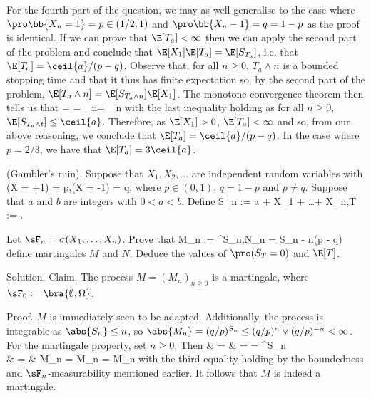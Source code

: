 For the fourth part of the question, we may as well generalise to the case where $\pro\bb{X_n =1} = p \in (1/2,1)$ and $\pro\bb{X_n-1} = q = 1- p$ as the proof is identical. If we can prove that $\E[T_a] < \infty$ then we can apply the second part of the problem and conclude that $\E[X_1]\E[T_a] = \E[S_{T_a}]$, i.e. that $\E[T_a] = \ceil{a}/(p-q)$. Observe that, for all $n \geq 0$, $T_a \land n$ is a bounded stopping time and that it thus has finite expectation so, by the second part of the problem, $\E[T_a\land n] = \E[S_{T_a\land n}] \E[X_1]$. The monotone convergence theorem then tells us that
 \leq \E[T_a]\E[X_1] = \E{} \E[X_1] = \lim_{n\to \infty}\E[T_a \land n]\E[X_1] = \lim_{n\to \infty}\E[S_{T_a\land n}] \leq {}
\ee
with the last inequality holding as for all $n\geq 0$, $\E[S_{T_a\land t}]\leq \ceil{a}$. Therefore, as $\E[X_1]>0$, $\E[T_a]< \infty$ and so, from our above reasoning, we conclude that $\E[T_a] = \ceil{a} /(p-q)$. In the case where $p = 2/3$, we have that $\E[T_a] = 3\ceil{a}$.

\vspace{2mm}

\qcutline


\item (Gambler's ruin). Suppose that $X_1,X_2, \dots$ are independent random variables with
\be
\pro(X = +1) = p,\quad \pro(X = -1) = q,
\ee
where $p \in (0, 1)$, $q = 1 - p$ and $p \neq q$. Suppose that $a$ and $b$ are integers with $ 0 < a < b$. Define
\be
S_n := a + X_1 + \dots + X_n,\quad T := \inf{}.
\ee

Let $\sF_n = \sigma(X_1, \dots ,X_n)$. Prove that
\be
M_n := ^{S_n},\quad N_n = S_n - n(p - q)
\ee
define martingales $M$ and $N$. Deduce the values of $\pro(S_T = 0)$ and $\E[T]$.

\scutline

Solution. Claim. The process $M = (M_n)_{n\geq 0}$ is a martingale, where $\sF_0 := \bra{\emptyset,\Omega}$.

Proof. $M$ is immediately seen to be adapted. Additionally, the process is integrable as $\abs{S_n} \leq n$, so $\abs{M_n} = (q/p)^{S_n} \leq  (q/p)^n \vee(q/p)^{-n} < \infty$. For the martingale property, set $n \geq 0$. Then
\beast
\E[M_{n+1}|\sF_n] & = & \E{} = \E{} = ^{S_n} \E{} \\
& = & M_n\E{} = M_n = M_n
\eeast
with the third equality holding by the boundedness and $\sF_n$-measurability mentioned earlier. It follows that $M$ is indeed a martingale.


